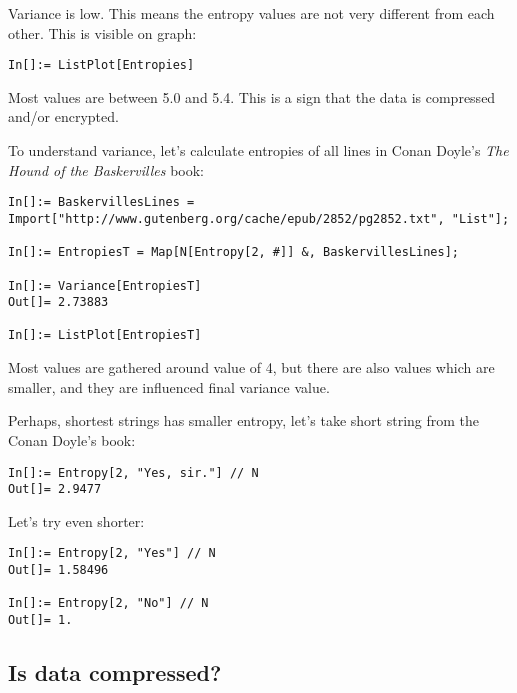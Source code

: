 Variance is low.
This means the entropy values are not very different from each other.
This is visible on graph:

\begin{lstlisting}
In[]:= ListPlot[Entropies]
\end{lstlisting}

\begin{figure}[H]
\centering
{}
\end{figure}

Most values are between 5.0 and 5.4.
This is a sign that the data is compressed and/or encrypted.

To understand variance, let's calculate entropies of all lines in Conan Doyle's \emph{The Hound of the Baskervilles} book:

\begin{lstlisting}
In[]:= BaskervillesLines = Import["http://www.gutenberg.org/cache/epub/2852/pg2852.txt", "List"];

In[]:= EntropiesT = Map[N[Entropy[2, #]] &, BaskervillesLines];

In[]:= Variance[EntropiesT]
Out[]= 2.73883

In[]:= ListPlot[EntropiesT]
\end{lstlisting}

\begin{figure}[H]
\centering
{}
\end{figure}

Most values are gathered around value of 4, but there are also values which are smaller,
and they are influenced final variance value.

Perhaps, shortest strings has smaller entropy, let's take short string from the Conan Doyle's book:

\begin{lstlisting}
In[]:= Entropy[2, "Yes, sir."] // N
Out[]= 2.9477
\end{lstlisting}

Let's try even shorter:

\begin{lstlisting}
In[]:= Entropy[2, "Yes"] // N
Out[]= 1.58496

In[]:= Entropy[2, "No"] // N
Out[]= 1.
\end{lstlisting}

\subsection{Is data compressed?}

